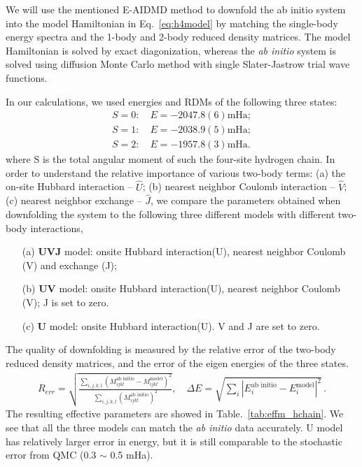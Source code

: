 \documentclass[prl,12pt,onecolumn,nofootinbib,notitlepage,english,superscriptaddress]{revtex4-1}
\begin{document}
We will use the mentioned E-AIDMD method to downfold the ab initio system into the model Hamiltonian in Eq.~\eqref{eq:h4model} by matching the single-body energy spectra and the 1-body and 2-body reduced density matrices. The model Hamiltonian is solved by exact diagonization, whereas the \textit{ab initio} system is solved using diffusion Monte Carlo method with single Slater-Jastrow trial wave functions. 

In our calculations, we used energies and RDMs of the following three states:
\begin{subequations}
\begin{eqnarray}
S=0: \quad E = -2047.8(6) \text{mHa}; \\
S=1: \quad E = -2038.9(5) \text{mHa}; \\
S=2: \quad E = -1957.8(3) \text{mHa}.
\end{eqnarray}
\end{subequations}
where S is the total angular moment of such the four-site hydrogen chain. In order to understand the relative importance of various two-body terms: (a) the on-site Hubbard interaction -- $\hat U$; (b) nearest neighbor Coulomb interaction -- $\hat V$; (c) nearest neighbor exchange -- $\hat J$, we compare the parameters obtained when downfolding the system to the following three different models with different two-body interactions,
\begin{itemize}
\item [(a)] \textbf{UVJ} model: onsite Hubbard interaction(U), nearest neighbor Coulomb (V) and exchange (J);
\item [(b)] \textbf{UV} model: onsite Hubbard interaction(U), nearest neighbor Coulomb (V);  J is set to zero. 
\item [(c)] \textbf{U} model: onsite Hubbard interaction(U). V and J are set to zero. 
\end{itemize}

The quality of downfolding is measured by the relative error of the two-body reduced density matrices, and the error of the eigen energies of the three states.
\begin{eqnarray}
R_{err} =\sqrt{\frac{\sum_{i,j,k,l}(M_{ijkl}^\text{ab initio} - M_{ijkl}^\text{model})^{2}}{\sum_{i,j,k,l}(M^\text{ab initio}_{ijkl})^{2} }}, \quad
\Delta E = \sqrt{\sum_{i}|E_{i}^\text{ab initio} - E_{i}^{\text{model}}|^{2}}\,.
\end{eqnarray}
The resulting effective parameters are showed in Table.~\ref{tab:effm_hchain}. We see that all the three models can match the \textit{ab initio} data accurately. U model has relatively larger error in energy, but it is still comparable to the stochastic error from QMC (0.3 $\sim$ 0.5 mHa).
\end{document}
